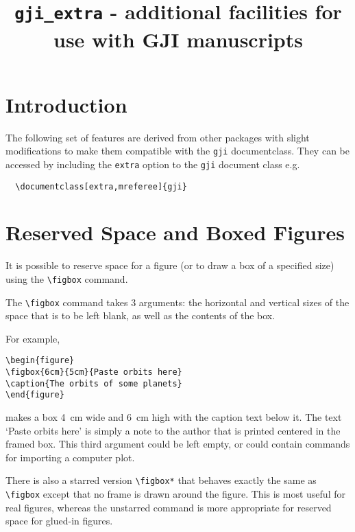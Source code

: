 \documentclass[extra,mreferee]{gji}
\title[\texttt{gji\_extra.sty} ]
  {\texttt{gji\_extra} - additional facilities for use with GJI
manuscripts}
\author[]  {}
\begin{document}
\maketitle

\section{Introduction}
The following set of features are derived from other packages with
slight modifications to make them compatible with the \verb"gji"
documentclass. They can be accessed by including the \verb"extra"
option to the \verb"gji" document class e.g.
\begin{verbatim}
  \documentclass[extra,mreferee]{gji}
\end{verbatim}

\section{Reserved Space and Boxed Figures }

It is possible to reserve space for a figure (or to draw a box of
a specified size) using the \verb!\figbox! command.

The \verb!\figbox! command takes 3 arguments: the
horizontal and vertical sizes of the space that is to be left blank, as well
as the contents of the box.


For example,
\begin{verbatim}
\begin{figure}
\figbox{6cm}{5cm}{Paste orbits here}
\caption{The orbits of some planets}
\end{figure}
\end{verbatim}
\begin{figure*}
\caption{Illustrating the use of the figbox command for a
display of the orbits of some planets}
\end{figure*}
makes a box 4~cm wide and 6~cm high with the caption text below it.
The text `Paste orbits here' is simply a note to the author that is
printed centered in the framed box. This third argument could be left empty,
or could contain commands for importing a computer plot.

There is also a starred version \verb!\figbox*! that behaves exactly the same
as \verb!\figbox! except that no frame is drawn around the figure. This is
most useful for real figures, whereas the unstarred command is more
appropriate for reserved space for glued-in figures.
\end{document}
